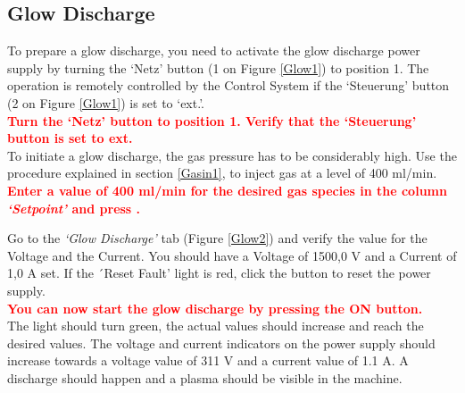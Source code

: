 \documentclass[fleqn,a4paper,20pt]{article}
\begin{document}
\newpage
\begin{minipage}{.53\textwidth}
\subsection{Glow Discharge}

To prepare a glow discharge, you need to activate the glow discharge power supply by turning the `Netz' button (1 on Figure \ref{Glow1}) to position 1. The operation is remotely controlled by the Control System if the `Steuerung' button (2 on Figure \ref{Glow1}) is set to `ext.'.\\

\textcolor{red}{\textbf{Turn the `Netz' button to position 1. Verify that the `Steuerung' button  is set to ext.}}\\

To initiate a glow discharge, the gas pressure has to be considerably high. Use the procedure explained in section \ref{Gasin1}, to inject gas at a level of 400 ml/min.\\

\textcolor{red}{\textbf{Enter a value of 400  ml/min for the desired gas species in the column \textit{`Setpoint'} and press \keys{\enter}.}}\\

Go to the \textit{`Glow Discharge'} tab (Figure \ref{Glow2}) and verify the value for the Voltage and the Current. You should have a Voltage of 1500,0 V and a Current of 1,0 A set. If the ´Reset Fault' light is red, click the button to reset the power supply.\\

\textcolor{red}{\textbf{You can now start the glow discharge by pressing the ON button.}}\\

The light should turn green, the actual values should increase and reach the desired values. The voltage and current indicators on the power supply should increase towards a voltage value of 311 V and a current value of 1.1 A. A discharge should happen and a plasma should be visible in the machine.\\




\end{minipage}
\begin{minipage}{.02\textwidth}
$\ $\\
\end{minipage}
\end{document}
